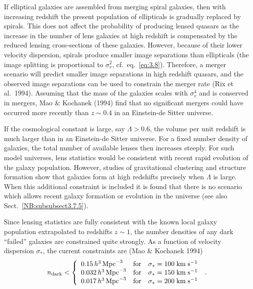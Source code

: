 \documentclass[a4paper,10pt]{article} %
\begin{document}
If elliptical galaxies are assembled from merging spiral galaxies,
then with increasing redshift the present population of ellipticals is
gradually replaced by spirals. This does not affect the probability of
producing lensed quasars as the increase in the number of lens
galaxies at high redshift is compensated by the reduced lensing
cross-sections of these galaxies. However, because of their lower
velocity dispersion, spirals produce smaller image separations than
ellipticals (the image splitting is proportional to $\sigma_v^2$, cf.\
eq.\ \ref{eq:3.8}). Therefore, a merger scenario will predict smaller
image separations in high redshift quasars, and the observed image
separations can be used to constrain the merger rate (Rix et al.\
1994). Assuming that the mass of the galaxies scales with $\sigma_v^4$
and is conserved in mergers, Mao \& Kochanek (1994) find that no
significant mergers could have occurred more recently than $z\sim0.4$
in an Einstein-de Sitter universe.

If the cosmological constant is large, say $\Lambda>0.6$, the volume
per unit redshift is much larger than in an Einstein-de Sitter
universe. For a fixed number density of galaxies, the total number of
available lenses then increases steeply. For such model universes,
lens statistics would be consistent with recent rapid evolution of the
galaxy population. However, studies of gravitational clustering and
structure formation show that galaxies form at high redshifts
precisely when $\Lambda$ is large. When this additional constraint is
included it is found that there is no scenario which allows recent
galaxy formation or evolution in the universe (see also Sect.\
\ref{NB:subsubsect3.7.5}).

Since lensing statistics are fully consistent with the known local
galaxy population extrapolated to redshifts $z\sim1$, the number
densities of any dark ``failed'' galaxies are constrained quite
strongly. As a function of velocity dispersion $\sigma_*$, the current
constraints are (Mao \& Kochanek 1994)
\begin{equation}
  n_{\rm dark} < \left\{
  \begin{array}{lll}
    0.15\,h^3\,{\rm Mpc}^{-3} & \hbox{for} &
      \sigma_*=100\;{\rm km}\;{\rm s}^{-1} \\
    0.032\,h^3\,{\rm Mpc}^{-3} & \hbox{for} &
      \sigma_*=150\;{\rm km}\;{\rm s}^{-1} \\
    0.017\,h^3\,{\rm Mpc}^{-3} & \hbox{for} &
      \sigma_*=200\;{\rm km}\;{\rm s}^{-1} \\
  \end{array}\right.\;.
\label{eq:3.32}
\end{equation}
\end{document}
